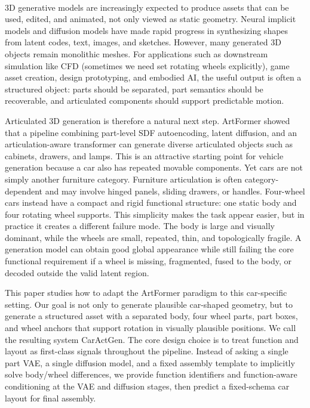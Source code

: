 \documentclass[10pt]{article}
\newcommand{\method}{CarActGen\xspace}
\newcommand{\artformer}{ArtFormer\xspace}
\begin{document}
\ 

3D generative models are increasingly expected to produce assets that can be used, edited, and animated, not only viewed as static geometry. Neural implicit models and diffusion models have made rapid progress in synthesizing shapes from latent codes, text, images, and sketches. However, many generated 3D objects remain monolithic meshes. For applications such as downstream simulation like CFD (sometimes we need set rotating wheels explicitly), game asset creation, design prototyping, and embodied AI, the useful output is often a structured object: parts should be separated, part semantics should be recoverable, and articulated components should support predictable motion.

Articulated 3D generation is therefore a natural next step. \artformer showed that a pipeline combining part-level SDF autoencoding, latent diffusion, and an articulation-aware transformer can generate diverse articulated objects such as cabinets, drawers, and lamps. This is an attractive starting point for vehicle generation because a car also has repeated movable components. Yet cars are not simply another furniture category. Furniture articulation is often category-dependent and may involve hinged panels, sliding drawers, or handles. Four-wheel cars instead have a compact and rigid functional structure: one static body and four rotating wheel supports. This simplicity makes the task appear easier, but in practice it creates a different failure mode. The body is large and visually dominant, while the wheels are small, repeated, thin, and topologically fragile. A generation model can obtain good global appearance while still failing the core functional requirement if a wheel is missing, fragmented, fused to the body, or decoded outside the valid latent region.

This paper studies how to adapt the \artformer paradigm to this car-specific setting. Our goal is not only to generate plausible car-shaped geometry, but to generate a structured asset with a separated body, four wheel parts, part boxes, and wheel anchors that support rotation in visually plausible positions. We call the resulting system \method. The core design choice is to treat function and layout as first-class signals throughout the pipeline. Instead of asking a single part VAE, a single diffusion model, and a fixed assembly template to implicitly solve body/wheel differences, we provide function identifiers and function-aware conditioning at the VAE and diffusion stages, then predict a fixed-schema car layout for final assembly.
\end{document}

